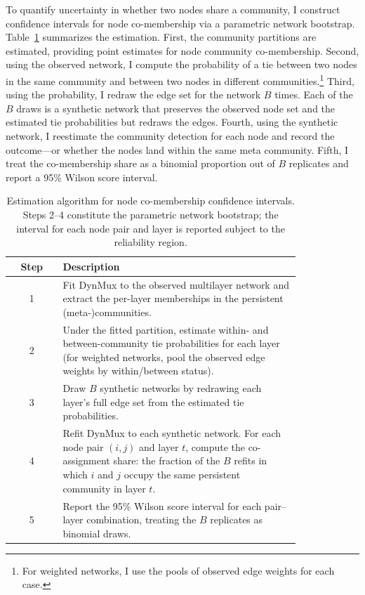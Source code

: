 \documentclass[11pt, letterpaper]{article}
\begin{document}
To quantify uncertainty in whether two nodes share a community, I construct confidence intervals for node co-membership via a parametric network bootstrap. Table~\ref{tab:ci_algorithm} summarizes the estimation. First, the community partitions are estimated, providing point estimates for node community co-membership. Second, using the observed network, I compute the probability of a tie between two nodes in the same community and between two nodes in different communities.\footnote{For weighted networks, I use the pools of observed edge weights for each case.} Third, using the probability, I redraw the edge set for the network $B$ times. Each of the $B$ draws is a synthetic network that preserves the observed node set and the estimated tie probabilities but redraws the edges. Fourth, using the synthetic network, I reestimate the community detection for each node and record the outcome---or whether the nodes land within the same meta community. Fifth, I treat the co-membership share as a binomial proportion out of $B$ replicates and report a 95\% Wilson score interval.

\begin{table}[t]
\footnotesize
\centering
\caption{Estimation algorithm for node co-membership confidence intervals.
Steps 2--4 constitute the parametric network bootstrap; the interval for each
node pair and layer is reported subject to the reliability region.}
\label{tab:ci_algorithm}
\begin{tabular}{cp{0.82\linewidth}}
\toprule
Step & Description \\
\midrule
1 & Fit DynMux to the observed multilayer network and extract the
    per-layer memberships in the persistent (meta-)communities. \\
2 & Under the fitted partition, estimate within- and between-community tie
    probabilities for each layer (for weighted networks, pool the observed
    edge weights by within/between status). \\
3 & Draw $B$ synthetic networks by redrawing each layer's full edge set from
    the estimated tie probabilities. \\
4 & Refit DynMux to each synthetic network. For each node pair $(i,j)$ and layer $t$, compute the co-assignment
    share: the fraction of the $B$ refits in which $i$ and $j$ occupy the
    same persistent community in layer $t$. \\
5 & Report the 95\% Wilson score interval for each pair--layer combination,
    treating the $B$ replicates as binomial draws. \\
\bottomrule
\end{tabular}
\end{table}
\end{document}
